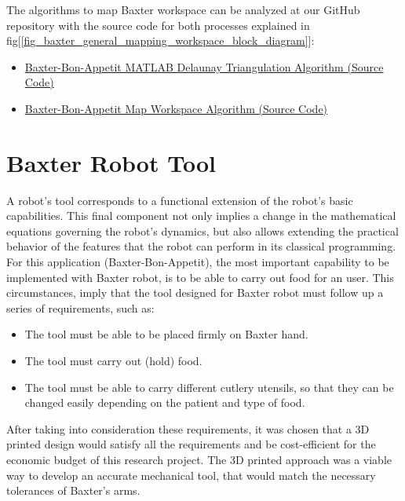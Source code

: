 \documentclass[11pt]{report} %
\begin{document}
The algorithms to map Baxter workspace can be analyzed at our GitHub repository  with the source code for both processes explained in fig[\ref{fig_baxter_general_mapping_workspace_block_diagram}]:\\

\begin{itemize}
    \color{blue}
    \item \href{https://github.com/san99tiago/baxter-bon-appetit/blob/main/matlab/Baxter_Workspace.m}{Baxter-Bon-Appetit MATLAB Delaunay Triangulation Algorithm (Source Code)}
    \color{blue}
    \item \href{https://github.com/san99tiago/baxter-bon-appetit/blob/main/python/baxter_bon_appetit/scripts/map_workspace.py}{Baxter-Bon-Appetit Map Workspace Algorithm (Source Code)}
\end{itemize}


\section{Baxter Robot Tool}

A robot's tool corresponds to a functional extension of the robot's basic capabilities. This final component not only implies a change in the mathematical equations governing the robot's dynamics, but also allows extending the practical behavior of the features that the robot can perform in its classical programming.\\

For this application (Baxter-Bon-Appetit), the most important capability to be implemented with Baxter robot, is to be able to carry out food for an user. This circumstances, imply that the tool designed for Baxter robot must follow up a series of requirements, such as:

\begin{itemize}
    \item The tool must be able to be placed firmly on Baxter hand.
    \item The tool must carry out (hold) food.
    \item The tool must be able to carry different cutlery utensils, so that they can be changed easily depending on the patient and type of food. 
\end{itemize}

After taking into consideration these requirements, it was chosen that a 3D printed design would satisfy all the requirements and be cost-efficient for the economic budget of this research project. The 3D printed approach was a viable way to develop an accurate mechanical tool, that would match the necessary tolerances of Baxter's arms.\\
\end{document}
